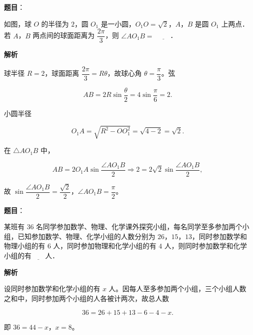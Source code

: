 \begin{answer}

\textbf{题目}：

如图，球 $O$ 的半径为 $2$，圆 $O_1$ 是一小圆，$O_1O=\sqrt2$，$A$，$B$ 是圆 $O_1$ 上两点．若 $A$，$B$ 两点间的球面距离为 $\dfrac{2\pi}3$，则 $\angle AO_1B=$ $\underline{\qquad}$．
\nopagebreak[4]
\begin{center}\end{center}
\nopagebreak[4]
\textbf{解析}

球半径 $R=2$，球面距离 $\dfrac{2\pi}3=R\theta$，故球心角 $\theta=\dfrac\pi3$。弦

\nopagebreak[4]
\[AB=2R\sin\frac\theta2=4\sin\frac\pi6=2.\]

小圆半径

\nopagebreak[4]
\[O_1A=\sqrt{R^2-OO_1^2}=\sqrt{4-2}=\sqrt2.\]

在 $\triangle AO_1B$ 中，

\nopagebreak[4]
\[AB=2O_1A\sin\frac{\angle AO_1B}2
\Longrightarrow 2=2\sqrt2\sin\frac{\angle AO_1B}2,\]

故 $\sin\dfrac{\angle AO_1B}2=\dfrac{\sqrt2}2$，$\angle AO_1B=\dfrac\pi2$。


\end{answer}
\begin{answer}

\textbf{题目}：

某班有 $36$ 名同学参加数学、物理、化学课外探究小组，每名同学至多参加两个小组，已知参加数学、物理、化学小组的人数分别为 $26$，$15$，$13$，同时参加数学和物理小组的有 $6$ 人，同时参加物理和化学小组的有 $4$ 人，则同时参加数学和化学小组的有$\underline{\qquad}$人．

\textbf{解析}

设同时参加数学和化学小组的有 $x$ 人。因每人至多参加两个小组，三个小组人数之和中，同时参加两个小组的人各被计两次，故总人数

\nopagebreak[4]
\[36=26+15+13-6-4-x.\]

即 $36=44-x$，$x=8$。


\end{answer}
